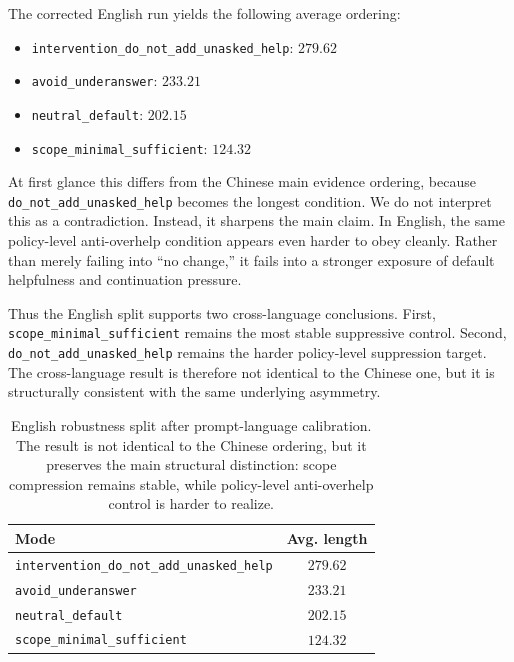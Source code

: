 \documentclass[11pt]{article}
\begin{document}
The corrected English run yields the following average ordering:
\begin{itemize}[leftmargin=1.5em]
  \item \texttt{intervention\_do\_not\_add\_unasked\_help}: $279.62$
  \item \texttt{avoid\_underanswer}: $233.21$
  \item \texttt{neutral\_default}: $202.15$
  \item \texttt{scope\_minimal\_sufficient}: $124.32$
\end{itemize}

At first glance this differs from the Chinese main evidence ordering, because \texttt{do\_not\_add\_unasked\_help} becomes the longest condition. We do not interpret this as a contradiction. Instead, it sharpens the main claim. In English, the same policy-level anti-overhelp condition appears even harder to obey cleanly. Rather than merely failing into ``no change,'' it fails into a stronger exposure of default helpfulness and continuation pressure.

Thus the English split supports two cross-language conclusions. First, \texttt{scope\_minimal\_sufficient} remains the most stable suppressive control. Second, \texttt{do\_not\_add\_unasked\_help} remains the harder policy-level suppression target. The cross-language result is therefore not identical to the Chinese one, but it is structurally consistent with the same underlying asymmetry.

\begin{table}[t]
\centering
\small
\caption{English robustness split after prompt-language calibration. The result is not identical to the Chinese ordering, but it preserves the main structural distinction: scope compression remains stable, while policy-level anti-overhelp control is harder to realize.}
\label{tab:english-robustness}
\begin{tabularx}{0.86\linewidth}{l c}
\toprule
Mode & Avg. length \\
\midrule
\texttt{intervention\_do\_not\_add\_unasked\_help} & $279.62$ \\
\texttt{avoid\_underanswer} & $233.21$ \\
\texttt{neutral\_default} & $202.15$ \\
\texttt{scope\_minimal\_sufficient} & $124.32$ \\
\bottomrule
\end{tabularx}
\end{table}
\end{document}
